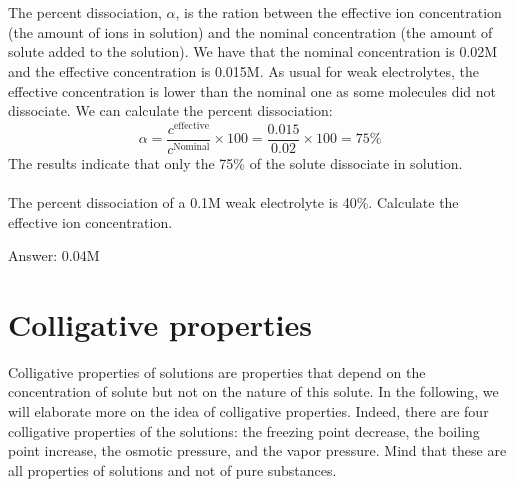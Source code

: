 \documentclass[main.tex]{subfiles}
\begin{document}
\begin{description}
\begin{example}
\\
 \\
The percent dissociation, $\alpha$, is the ration between the effective ion concentration (the amount of ions in solution) and the nominal concentration (the amount of solute added to the solution). We have that the nominal concentration is 0.02M and the effective concentration is 0.015M. As usual for weak electrolytes, the effective concentration is lower than the nominal one as some molecules did not dissociate. We can calculate the percent dissociation:
\[\alpha=\frac{c^{\text{effective}}}{c^{\text{Nominal}}} \times 100=\frac{0.015}{0.02}\times 100=75\%\]
The results indicate that only the 75\% of the solute dissociate in solution.\\
 \faDiamond\ \\
The percent dissociation of a 0.1M weak electrolyte is 40\%. Calculate the effective ion concentration.
\\
\begin{flushright} Answer: 0.04M\end{flushright}
\end{example}%
\end{description}


\section{Colligative properties}
Colligative properties of solutions are properties that depend on the concentration of solute but not on the nature of this solute. In the following, we will elaborate more on the idea of colligative properties. Indeed, there are four colligative properties of the solutions: the freezing point decrease, the boiling point increase, the osmotic pressure, and the vapor pressure. Mind that these are all properties of solutions and not of pure substances.
\end{document}
